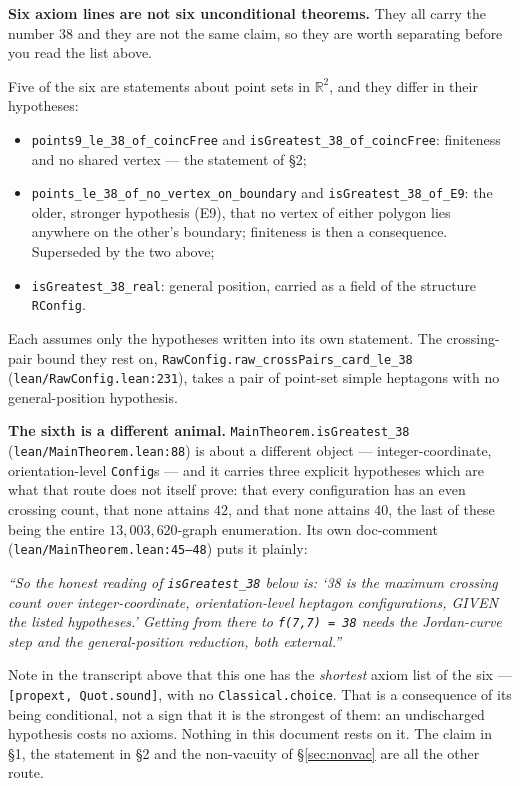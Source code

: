 \documentclass[11pt]{article}
\newcommand{\code}[1]{\texttt{\small #1}}
\newenvironment{trustbox}%
  {\par\medskip\setlength{\fboxsep}{9pt}%
   \begin{lrbox}{\trustboxbuf}%
   \begin{minipage}{\dimexpr\textwidth-2\fboxsep-2\fboxrule\relax}}%
  {\end{minipage}\end{lrbox}%
   \noindent\fcolorbox{black!35}{black!4}{\usebox{\trustboxbuf}}\par\medskip}
\begin{document}


\begin{trustbox}
\textbf{Six axiom lines are not six unconditional theorems.} They all carry the
number $38$ and they are not the same claim, so they are worth separating
before you read the list above.

\smallskip
\noindent Five of the six are statements about point sets in $\mathbb{R}^2$,
and they differ in their hypotheses:
\begin{itemize}
\item \code{points9\_le\_38\_of\_coincFree} and
  \code{isGreatest\_38\_of\_coincFree}: finiteness and no shared vertex --- the
  statement of \S2;
\item \code{points\_le\_38\_of\_no\_vertex\_on\_boundary} and
  \code{isGreatest\_38\_of\_E9}: the older, stronger hypothesis (E9), that no
  vertex of either polygon lies anywhere on the other's boundary; finiteness
  is then a consequence. Superseded by the two above;
\item \code{isGreatest\_38\_real}: general position, carried as a field of the
  structure \code{RConfig}.
\end{itemize}
Each assumes only the hypotheses written into its own statement. The
crossing-pair bound they rest on, \code{RawConfig.raw\_crossPairs\_card\_le\_38}
(\code{lean/RawConfig.lean:231}), takes a pair of point-set simple heptagons
with no general-position hypothesis.

\smallskip
\noindent \textbf{The sixth is a different animal.}
\code{MainTheorem.isGreatest\_38} (\code{lean/MainTheorem.lean:88}) is about a
different object --- integer-coordinate, orientation-level \code{Config}s ---
and it carries three explicit hypotheses which are what that route does
not itself prove: that every configuration has an
even crossing count, that none attains $42$, and that none attains $40$, the
last of these being the entire $13{,}003{,}620$-graph enumeration. Its own
doc-comment (\code{lean/MainTheorem.lean:45--48}) puts it plainly:

\smallskip
\noindent\emph{``So the honest reading of \code{isGreatest\_38} below is: `38
is the maximum crossing count over integer-coordinate, orientation-level
heptagon configurations, GIVEN the listed hypotheses.' Getting from there to
\code{f(7,7) = 38} needs the Jordan-curve step and the general-position
reduction, both external.''}

\smallskip
\noindent Note in the transcript above that this one has the \emph{shortest}
axiom list of the six --- \code{[propext, Quot.sound]}, with no
\code{Classical.choice}. That is a consequence of its being conditional, not a
sign that it is the strongest of them: an undischarged hypothesis costs no
axioms. Nothing in this document rests on it. The claim in \S1, the statement
in \S2 and the non-vacuity of \S\ref{sec:nonvac} are all the other route.
\end{trustbox}
\end{document}
